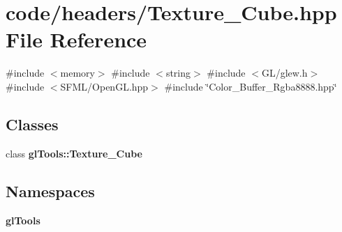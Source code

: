 \section{code/headers/\+Texture\+\_\+\+Cube.hpp File Reference}
\label{_texture___cube_8hpp}
{\ttfamily \#include $<$memory$>$}\newline
{\ttfamily \#include $<$string$>$}\newline
{\ttfamily \#include $<$G\+L/glew.\+h$>$}\newline
{\ttfamily \#include $<$S\+F\+M\+L/\+Open\+G\+L.\+hpp$>$}\newline
{\ttfamily \#include \char`\"{}Color\+\_\+\+Buffer\+\_\+\+Rgba8888.\+hpp\char`\"{}}\newline
\subsection*{Classes}
\begin{DoxyCompactItemize}
\item 
class \textbf{ gl\+Tools\+::\+Texture\+\_\+\+Cube}
\end{DoxyCompactItemize}
\subsection*{Namespaces}
\begin{DoxyCompactItemize}
\item 
 \textbf{ gl\+Tools}
\end{DoxyCompactItemize}
